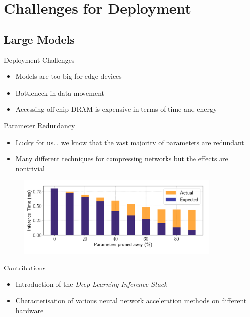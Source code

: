 \documentclass{beamer}
\begin{document}
\section{Challenges for Deployment}

\subsection{Large Models}

\begin{frame}{Deployment Challenges}

\begin{itemize}
	\item Models are too big for edge devices 
    \item Bottleneck in data movement
    \item Accessing off chip DRAM is expensive in terms of time and energy
\end{itemize}

\end{frame}

\begin{frame}{Parameter Redundancy}



\begin{itemize}
	\item Lucky for us... we know that the vast majority of parameters are redundant 
    \item Many different techniques for compressing networks but the effects are nontrivial
\end{itemize}

\begin{figure}
    \centering
    \includegraphics[width=10cm]{images/speedup.pdf}
\end{figure}



\end{frame}


\begin{frame}{Contributions}
    
    \begin{itemize}
        \item Introduction of the \textit{Deep Learning Inference Stack}
        \item Characterisation of various neural network acceleration methods on different hardware
    \end{itemize}
    
\end{frame}
\end{document}
